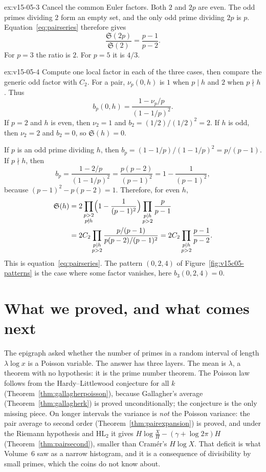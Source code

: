 \begin{solution}{ex:v15-05-3}
\idea Cancel the common Euler factors.
\writeup Both \(2\) and \(2p\) are even. The odd primes dividing \(2\) form an empty set, and the only odd prime dividing \(2p\) is \(p\). Equation~\eqref{eq:pairseries} therefore gives
\[
\frac{\mathfrak S(2p)}{\mathfrak S(2)}=\frac{p-1}{p-2}.
\]
For \(p=3\) the ratio is \(2\). For \(p=5\) it is \(4/3\).
\end{solution}

\begin{solution}{ex:v15-05-4}
\idea Compute one local factor in each of the three cases, then compare the generic odd factor with \(C_2\).
\writeup For a pair, \(\nu_p(0,h)\) is \(1\) when \(p\mid h\) and \(2\) when \(p\nmid h\). Thus
\[
b_p(0,h)=\frac{1-\nu_p/p}{(1-1/p)^2}.
\]
If \(p=2\) and \(h\) is even, then \(\nu_2=1\) and \(b_2=(1/2)/(1/2)^2=2\). If \(h\) is odd, then \(\nu_2=2\) and \(b_2=0\), so \(\mathfrak S(h)=0\).

If \(p\) is an odd prime dividing \(h\), then \(b_p=(1-1/p)/(1-1/p)^2=p/(p-1)\). If \(p\nmid h\), then
\[
b_p=\frac{1-2/p}{(1-1/p)^2}=\frac{p(p-2)}{(p-1)^2}=1-\frac1{(p-1)^2},
\]
because \((p-1)^2-p(p-2)=1\). Therefore, for even \(h\),
\begin{align*}
\mathfrak S(h)
&=2\prod_{\substack{p>2\\p\nmid h}}\Bigl(1-\frac1{(p-1)^2}\Bigr)
\prod_{\substack{p\mid h\\p>2}}\frac p{p-1}\\
&=2C_2\prod_{\substack{p\mid h\\p>2}}
\frac{p/(p-1)}{p(p-2)/(p-1)^2}
=2C_2\prod_{\substack{p\mid h\\p>2}}\frac{p-1}{p-2}.
\end{align*}
This is equation~\eqref{eq:pairseries}. The pattern \((0,2,4)\) of Figure~\ref{fig:v15c05-patterns} is the case where some factor vanishes, here \(b_3(0,2,4)=0\).
\end{solution}

\section{What we proved, and what comes next}

The epigraph asked whether the number of primes in a random interval of length $\lambda\log x$ is a Poisson variable. The answer has three layers. The mean is $\lambda$, a theorem with no hypothesis: it is the prime number theorem. The Poisson law follows from the Hardy--Littlewood conjecture for all $k$ (Theorem~\ref{thm:gallagherpoisson}), because Gallagher's average (Theorem~\ref{thm:gallagherk}) is proved unconditionally; the conjecture is the only missing piece. On longer intervals the variance is \emph{not} the Poisson variance: the pair average to second order (Theorem~\ref{thm:pairexpansion}) is proved, and under the Riemann hypothesis and HL$_2$ it gives $H\log\frac XH-(\gamma+\log2\pi)H$ (Theorem~\ref{thm:pairsecond}), smaller than Cram\'er's $H\log X$. That deficit is what Volume~6 saw as a narrow histogram, and it is a consequence of divisibility by small primes, which the coins do not know about.

